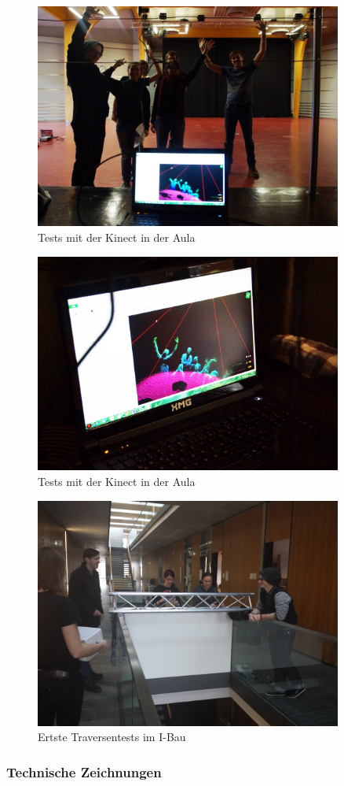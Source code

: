 \begin{figure}[htbp]
	\centering
		\includegraphics[width=0.9\textwidth]{images/Test2.png}
	\caption{Tests mit der Kinect in der Aula}
	\label{fig:Test2}
\end{figure}

\begin{figure}[htbp]
	\centering
		\includegraphics[width=0.9\textwidth]{images/Test3.png}
	\caption{Tests mit der Kinect in der Aula}
	\label{fig:Test3}
\end{figure}

\begin{figure}[htbp]
	\centering
		\includegraphics[width=0.9\textwidth]{images/Test4.jpg}
	\caption{Ertste Traversentests im I-Bau}
	\label{fig:Test4}
\end{figure}
\clearpage

\subsubsection{Technische Zeichnungen}
